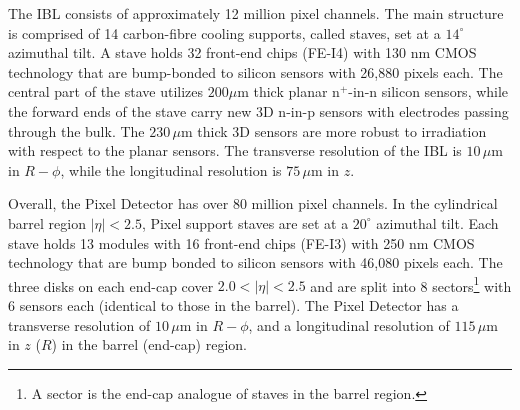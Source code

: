 The IBL consists of approximately 12 million pixel channels. The main structure is comprised of 14 carbon-fibre cooling supports, called staves, set at a $14^{\circ}$ azimuthal tilt.
A stave holds 32 front-end chips (FE-I4) with 130 nm CMOS technology that are bump-bonded
to silicon sensors with 26,880 pixels each. 
The central part of the stave utilizes $200 \mu$m thick planar n$^+$-in-n silicon sensors, while the forward ends of the stave carry new 3D n-in-p sensors with electrodes passing through the bulk. The $230\,\mu$m thick 3D sensors are more robust to irradiation with respect to the planar sensors. The transverse resolution of the IBL is $10\,\mu$m in $R-\phi$, while the longitudinal resolution is $75\,\mu$m in $z$.

Overall, the Pixel Detector has over 80 million pixel channels. In the cylindrical barrel region $|\eta|<2.5$, Pixel support staves are set at a $20^{\circ}$ azimuthal tilt.
Each stave holds 13 modules with 16 front-end chips (FE-I3) with 250 nm CMOS technology that are bump bonded to silicon sensors with 46,080 pixels each. 
The three disks on each end-cap cover $2.0< |\eta| < 2.5$ and are split into 8 sectors\footnote{
A sector is the end-cap analogue of staves in the barrel region.} 
with 6 sensors each (identical to those in the barrel). The Pixel Detector has a transverse resolution of $10\,\mu$m in $R-\phi$, and a longitudinal resolution of $115\,\mu$m in $z$ ($R$) in the barrel (end-cap) region. 

